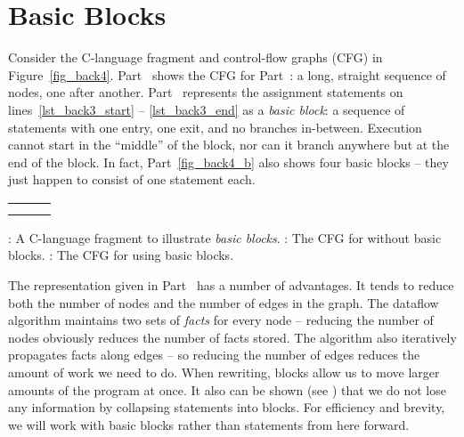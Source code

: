 \documentclass[12pt]{report}
\begin{document}
\section{Basic Blocks}
\label{sec_back3}


Consider the C-language fragment and control-flow graphs (CFG) in
Figure~\ref{fig_back4}.  Part~ shows the CFG for
Part~: a long, straight sequence of nodes, one
after another. Part~ represents the assignment statements on
lines~\ref{lst_back3_start} -- \ref{lst_back3_end} as a \emph{basic
  block}: a sequence of statements with one entry, one exit, and no
branches in-between. Execution cannot start in the ``middle'' of the
block, nor can it branch anywhere but at the end of the block. In fact,
Part~\ref{fig_back4_b} also shows four basic blocks -- they just happen
to consist of one statement each.

\begin{myfig}
\begin{tabular}{m{1.5in}m{1.5in}m{1.5in}}
  \begin{center}
    \subfloat{\label{fig_back4_a}}
  \end{center} & %
  \begin{center}
    \subfloat{\label{fig_back4_b}}
  \end{center}
  & %
  \begin{center}
    \subfloat{\label{fig_back4_c}}
  \end{center} \\
  \vtop{\centering\subref{fig_back4_a}} & \vtop{\centering\subref{fig_back4_b}} & \vtop{\centering\subref{fig_back4_c}} \\
\end{tabular}
\caption{: A C-language fragment to illustrate
  \emph{basic blocks}.  : The CFG for
   without basic blocks. : The
  CFG for  using basic blocks.}
\label{fig_back4}
\end{myfig}

The representation given in Part~ has a number of
advantages. It tends to reduce both the number of nodes and the number
of edges in the graph. The dataflow algorithm maintains two sets of
\emph{facts} for every node -- reducing the number of nodes obviously
reduces the number of facts stored. The algorithm also iteratively
propagates facts along edges -- so reducing the number of edges
reduces the amount of work we need to do. When rewriting, blocks allow
us to move larger amounts of the program at once. It also can be shown
(see \citep{AhoXX}) that we do not lose any information by collapsing
statements into blocks. For efficiency and brevity, we will work with
basic blocks rather than statements from here forward.
\end{document}
